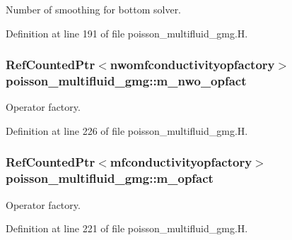 Number of smoothing for bottom solver. 



Definition at line 191 of file poisson\+\_\+multifluid\+\_\+gmg.\+H.

\subsubsection[{\texorpdfstring{m\+\_\+nwo\+\_\+opfact}{m_nwo_opfact}}]{\setlength{\rightskip}{0pt plus 5cm}Ref\+Counted\+Ptr$<${\bf nwomfconductivityopfactory}$>$ poisson\+\_\+multifluid\+\_\+gmg\+::m\+\_\+nwo\+\_\+opfact\hspace{0.3cm}{\ttfamily [protected]}}\hypertarget{classpoisson__multifluid__gmg_a906eb726a2928f1921e62a6a08546f35}{}\label{classpoisson__multifluid__gmg_a906eb726a2928f1921e62a6a08546f35}


Operator factory. 



Definition at line 226 of file poisson\+\_\+multifluid\+\_\+gmg.\+H.

\subsubsection[{\texorpdfstring{m\+\_\+opfact}{m_opfact}}]{\setlength{\rightskip}{0pt plus 5cm}Ref\+Counted\+Ptr$<${\bf mfconductivityopfactory}$>$ poisson\+\_\+multifluid\+\_\+gmg\+::m\+\_\+opfact\hspace{0.3cm}{\ttfamily [protected]}}\hypertarget{classpoisson__multifluid__gmg_a477260f39846ba1eb5cd410657f9a456}{}\label{classpoisson__multifluid__gmg_a477260f39846ba1eb5cd410657f9a456}


Operator factory. 



Definition at line 221 of file poisson\+\_\+multifluid\+\_\+gmg.\+H.

